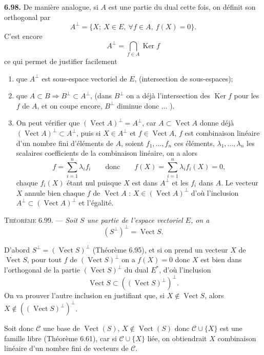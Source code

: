 \medskip\noindent\textbf{6.98.} De manière analogue, si $A$ est une partie du dual cette fois, on définit son orthogonal par
\[
A^\perp=\{X;\ X\in E,\ \forall f\in A,\ f(X)=0\}.
\]
C'est encore
\[
A^\perp=\bigcap_{f\in A}\operatorname{Ker} f
\]
ce qui permet de justifier facilement
\begin{enumerate}[label=\arabic*),leftmargin=2.1em]
\item que $A^\perp$ est sous-espace vectoriel de $E$, (intersection de sous-espaces);
\item que $A\subset B\Rightarrow B^\perp\subset A^\perp$, (dans $B^\perp$ on a déjà l'intersection des $\operatorname{Ker} f$ pour les $f$ de $A$, et on coupe encore, $B^\perp$ diminue donc ... ).
\item On peut vérifier que $(\operatorname{Vect}A)^\perp=A^\perp$, car $A\subset\operatorname{Vect}A$ donne déjà $(\operatorname{Vect}A)^\perp\subset A^\perp$, puis si $X\in A^\perp$ et $f\in\operatorname{Vect}A$, $f$ est combinaison linéaire d'un nombre fini d'éléments de $A$, soient $f_1,\ldots,f_n$ ces éléments, $\lambda_1,\ldots,\lambda_n$ les scalaires coefficients de la combinaison linéaire, on a alors
\[
f=\sum_{i=1}^n\lambda_i f_i\qquad\text{donc}\qquad f(X)=\sum_{i=1}^n\lambda_i f_i(X)=0,
\]
chaque $f_i(X)$ étant nul puisque $X$ est dans $A^\perp$ et les $f_i$ dans $A$. Le vecteur $X$ annule bien chaque $f$ de $\operatorname{Vect}A$ : $X\in(\operatorname{Vect}A)^\perp$ d'où l'inclusion $A^\perp\subset(\operatorname{Vect}A)^\perp$ et l'égalité.
\end{enumerate}

\medskip\noindent\textsc{Théorème 6.99.} --- \emph{Soit $S$ une partie de l'espace vectoriel $E$, on a
\[
(S^\perp)^\perp=\operatorname{Vect}S.
\]}

D'abord $S^\perp=(\operatorname{Vect}S)^\perp$ (Théorème 6.95), et si on prend un vecteur $X$ de $\operatorname{Vect}S$, pour tout $f$ de $(\operatorname{Vect}S)^\perp$ on a $f(X)=0$ donc $X$ est bien dans l'orthogonal de la partie $(\operatorname{Vect}S)^\perp$ du dual $E^*$, d'où l'inclusion
\[
\operatorname{Vect}S\subset((\operatorname{Vect}S)^\perp)^\perp.
\]
On va prouver l'autre inclusion en justifiant que, si $X\notin\operatorname{Vect}S$, alors $X\notin((\operatorname{Vect}S)^\perp)^\perp$.

Soit donc $\mathcal C$ une base de $\operatorname{Vect}(S)$, $X\notin\operatorname{Vect}(S)$ donc $\mathcal C\cup\{X\}$ est une famille libre (Théorème 6.61), car si $\mathcal C\cup\{X\}$ liée, on obtiendrait $X$ combinaison linéaire d'un nombre fini de vecteurs de $\mathcal C$.

